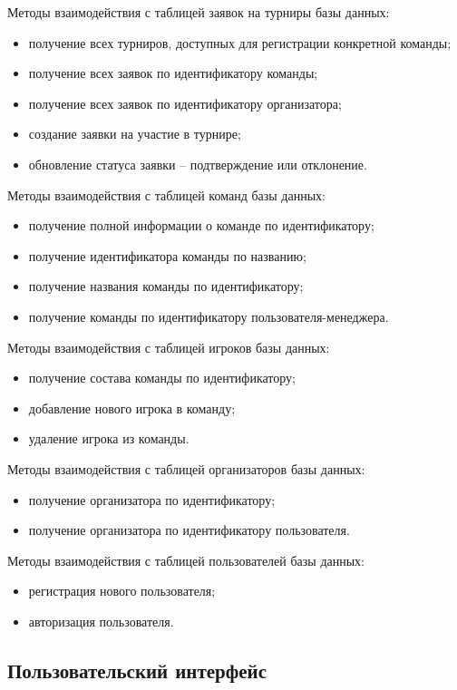 Методы взаимодействия с таблицей заявок на турниры базы данных:
\begin{itemize}
	\item получение всех турниров, доступных для регистрации конкретной команды;
	\item получение всех заявок по идентификатору команды;
	\item получение всех заявок по идентификатору организатора;
	\item создание заявки на участие в турнире;
	\item обновление статуса заявки -- подтверждение или отклонение.
\end{itemize}

Методы взаимодействия с таблицей команд базы данных:
\begin{itemize}
	\item получение полной информации о команде по идентификатору;
	\item получение идентификатора команды по названию;
	\item получение названия команды по идентификатору;
	\item получение команды по идентификатору пользователя-менеджера.
\end{itemize}

Методы взаимодействия с таблицей игроков базы данных:
\begin{itemize}
	\item получение состава команды по идентификатору;
	\item добавление нового игрока в команду;
	\item удаление игрока из команды.
\end{itemize}

Методы взаимодействия с таблицей организаторов базы данных:
\begin{itemize}
	\item получение организатора по идентификатору;
	\item получение организатора по идентификатору пользователя.
\end{itemize}

Методы взаимодействия с таблицей пользователей базы данных:
\begin{itemize}
	\item регистрация нового пользователя;
	\item авторизация пользователя.
\end{itemize}

\subsection{Пользовательский интерфейс}

